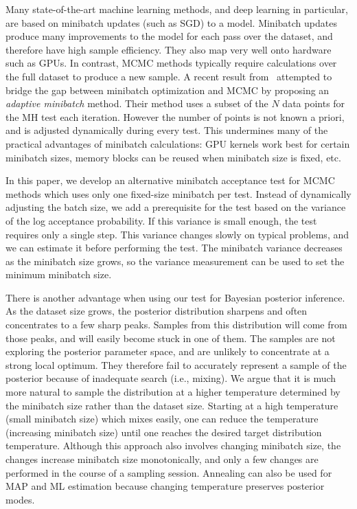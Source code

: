\documentclass{article}
\begin{document}
Many state-of-the-art machine learning methods, and deep learning in
particular, are based on minibatch updates (such as SGD) to a model.
Minibatch updates produce many improvements to the model for each pass
over the dataset, and therefore have high sample efficiency. They also map very
well onto hardware such as GPUs. In contrast, MCMC methods typically
require calculations over the full dataset to produce a new sample. A
recent result from~\cite{cutting_mh_2014} attempted to bridge the gap
between minibatch optimization and MCMC by proposing an \emph{adaptive
  minibatch} method. Their method uses a subset of the $N$ data points
for the MH test each iteration. However the number of points is not
known a priori, and is adjusted dynamically during every test. This
undermines many of the practical advantages of minibatch calculations: 
GPU kernels work best for certain minibatch sizes, memory blocks
can be reused when minibatch size is fixed, etc. 

In this paper, we develop an alternative minibatch acceptance test for MCMC
methods which uses only one fixed-size minibatch per test. Instead of
dynamically adjusting the batch size, we add a prerequisite for the test
based on the variance of the log acceptance probability. If this
variance is small enough, the test requires only a single step. This
variance changes slowly on typical problems, and we can estimate it
before performing the test. The minibatch variance
decreases as the minibatch size grows, so the variance measurement can be
used to set the minimum minibatch size.

There is another advantage when using our test for Bayesian posterior inference. As the dataset size
grows, the posterior distribution sharpens and often concentrates to a few sharp peaks. Samples from
this distribution will come from those peaks, and will easily become stuck in one of them. The
samples are not exploring the posterior parameter space, and are unlikely to concentrate at a strong
local optimum. They therefore fail to accurately represent a sample of the posterior because of
inadequate search (i.e., mixing). We argue that it is much more natural to sample the distribution
at a higher temperature determined by the minibatch size rather than the dataset size. Starting at a
high temperature (small minibatch size) which mixes easily, one can reduce the temperature
(increasing minibatch size) until one reaches the desired target distribution temperature.  Although
this approach also involves changing minibatch size, the changes increase minibatch size
monotonically, and only a few changes are performed in the course of a sampling session.  Annealing
can also be used for MAP and ML estimation because changing temperature preserves posterior modes. 
\end{document}
